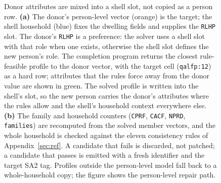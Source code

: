 \begin{figure}[t]
{%
}
\caption{Donor attributes are mixed into a shell slot, not copied as a person
row. \textbf{(a)} The donor's person-level vector (orange) is the target; the
shell household (blue) fixes the dwelling fields and supplies the
\texttt{RLHP} slot. The donor's \texttt{RLHP} is a preference: the solver uses a
shell slot with that role when one exists, otherwise the shell slot defines the
new person's role. The completion program returns the closest rule-feasible
profile to the donor vector, with the target cell (\texttt{qalfp:12}) as a hard
row; attributes that the rules force away from the donor value are shown in
green. The solved profile is written into the shell's slot, so the new person
carries the donor's attributes where the rules allow and the shell's household
context everywhere else. \textbf{(b)} The family and household counters
(\texttt{CPRF}, \texttt{CACF}, \texttt{NPRD}, \texttt{families}) are recomputed
from the solved member vectors, and the whole household is checked against the
eleven consistency rules of Appendix~\ref{sec:ref}. A candidate that fails is
discarded, not patched; a candidate that passes is emitted with a fresh
identifier and the target SA2 tag. Profiles outside the person-level model fall
back to a whole-household copy; the figure shows the person-level repair path.}
\label{fig:donor_chromosome}
\end{figure}
